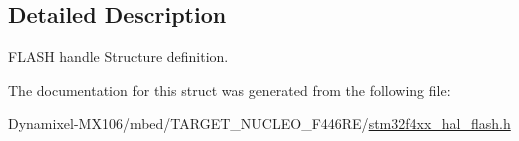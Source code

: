 \subsection{Detailed Description}
F\+L\+A\+SH handle Structure definition. 

The documentation for this struct was generated from the following file\+:\begin{DoxyCompactItemize}
\item 
Dynamixel-\/\+M\+X106/mbed/\+T\+A\+R\+G\+E\+T\+\_\+\+N\+U\+C\+L\+E\+O\+\_\+\+F446\+R\+E/\hyperlink{stm32f4xx__hal__flash_8h}{stm32f4xx\+\_\+hal\+\_\+flash.\+h}\end{DoxyCompactItemize}
